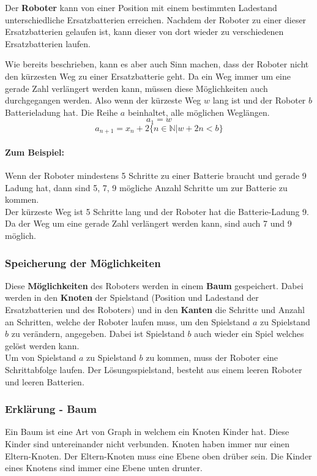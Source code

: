 \documentclass[a4paper,12pt,arial]{scrartcl}
\begin{document}
Der \textbf{Roboter} kann von einer Position mit einem bestimmten Ladestand unterschiedliche Ersatzbatterien erreichen. Nachdem der Roboter zu einer dieser Ersatzbatterien gelaufen ist, kann dieser von dort wieder zu verschiedenen Ersatzbatterien laufen.
\par
Wie bereits beschrieben, kann es aber auch Sinn machen, dass der Roboter nicht den kürzesten Weg zu einer Ersatzbatterie geht. Da ein Weg immer um eine gerade Zahl verlängert werden kann, müssen diese Möglichkeiten auch durchgegangen werden.
Also wenn der kürzeste Weg $w$ lang ist und der Roboter $b$ Batterieladung hat. Die Reihe $a$ beinhaltet, alle möglichen Weglängen.
\[  a_1 = w \]
\[ a_{n+1} = x_{n} + 2  \{n \in \mathbb{N} | w + 2n < b\} \]
\paragraph{Zum Beispiel:}
Wenn der Roboter mindestens 5 Schritte zu einer Batterie braucht und gerade 9 Ladung hat, dann sind 5, 7, 9 mögliche Anzahl Schritte um zur Batterie zu kommen.
\\
Der kürzeste Weg ist 5 Schritte lang und der Roboter hat die Batterie-Ladung 9. Da der Weg um eine gerade Zahl verlängert werden kann, sind auch 7 und 9 möglich.

\subsubsection{Speicherung der Möglichkeiten}

Diese \textbf{Möglichkeiten} des Roboters werden in einem \textbf{Baum} gespeichert.
Dabei werden in den \textbf{Knoten} der Spielstand (Position und Ladestand der Ersatzbatterien und des Roboters) und in den \textbf{Kanten} die Schritte und Anzahl an Schritten, welche der Roboter laufen muss, um den Spielstand $a$ zu Spielstand $b$ zu verändern, angegeben.
Dabei ist Spielstand $b$ auch wieder ein Spiel welches gelöst werden kann.
\\
Um von Spielstand $a$ zu Spielstand $b$ zu kommen, muss der Roboter eine Schrittabfolge laufen.
Der Lösungsspielstand, besteht aus einem leeren Roboter und leeren Batterien.

\par
\subsubsection{Erklärung - Baum}
Ein Baum ist eine Art von Graph in welchem ein Knoten Kinder hat. Diese Kinder sind untereinander nicht verbunden.
Knoten haben immer nur einen Eltern-Knoten. Der Eltern-Knoten muss eine Ebene oben drüber sein. Die Kinder eines Knotens sind immer eine Ebene unten drunter.
\end{document}
